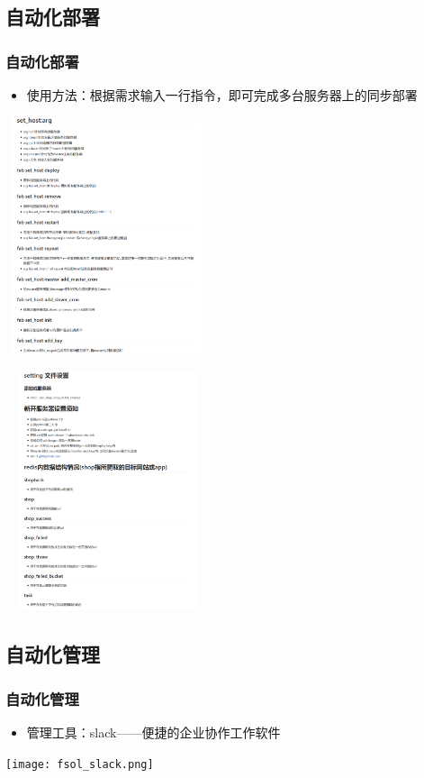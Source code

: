 \documentclass{beamer}
\begin{document}
\subsection{自动化部署}
\begin{frame}[allowframebreaks]
\frametitle{自动化部署}
\begin{itemize}
\item 使用方法：根据需求输入一行指令，即可完成多台服务器上的同步部署
\end{itemize}
\end{frame}
\begin{frame}
\begin{multicols}{2}
\begin{center}
\includegraphics[width=6cm,height=7cm]{fsol_deploy1.png}
\end{center}
\includegraphics[width=6cm,height=7cm]{fsol_deploy2.png}
\end{multicols}
\end{frame}

\subsection{自动化管理}
\begin{frame}
\frametitle{自动化管理}
\begin{multicols}{2}
\begin{itemize}
\item  管理工具：slack——便捷的企业协作工作软件
\end{itemize}
\begin{center}
 \texttt{[image: fsol\_slack.png]}
\end{center}
\end{multicols}
\end{frame}
\end{document}
